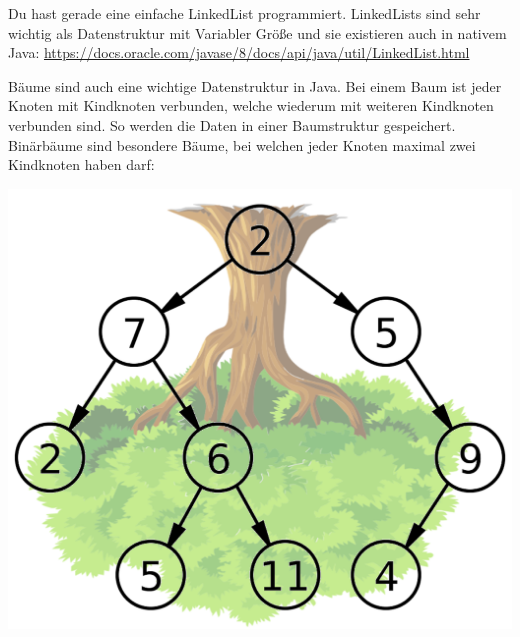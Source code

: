 \documentclass{../../sheet}
\begin{document}
Du hast gerade eine einfache LinkedList programmiert. LinkedLists sind sehr wichtig als Datenstruktur mit Variabler Größe und sie existieren auch in nativem Java: \url{https://docs.oracle.com/javase/8/docs/api/java/util/LinkedList.html}

\newpage
{}
Bäume sind auch eine wichtige Datenstruktur in Java. Bei einem Baum ist jeder Knoten mit Kindknoten verbunden, welche wiederum mit weiteren Kindknoten verbunden sind. So werden die Daten in einer Baumstruktur gespeichert. Binärbäume sind besondere Bäume, bei welchen jeder Knoten maximal zwei Kindknoten haben darf: 
\\
\begin{center}
    \includegraphics[width=0.5\linewidth]{img/baum.png}
\end{center}
\end{document}
